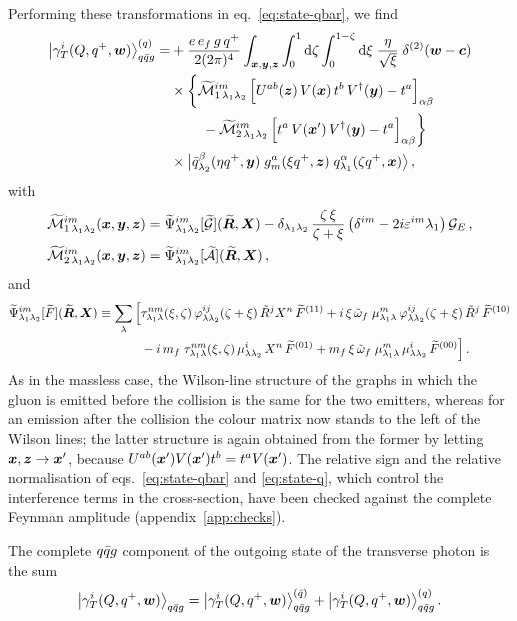 Performing these transformations in eq.~\eqref{eq:state-qbar}, we find
\begin{align}
\big|\gamma_T^i(Q,q^+,\bm{w})\big\rangle^{(q)}_{q\bar q g}=&+\frac{e\,e_f\,g\,q^+}{2(2\pi)^4}\int_{\bm{x},\bm{y},\bm{z}}
\int_0^1{\rm d}\zeta\int_0^{1-\zeta}{\rm d}\xi\;\frac{\eta}{\sqrt\xi}\;\delta^{(2)}(\bm{w}-\bm{c})
\nonumber\\
&\times\bigg\{\widetilde{\mathcal{M}}^{im}_{1\,\lambda_1\lambda_2}\,\Big[U^{ab}(\bm{z})\,V(\bm{x})\,t^b\,V^\dagger(\bm{y})-t^a\Big]_{\alpha\beta}
\nonumber\\
&\qquad\;-\widetilde{\mathcal{M}}^{im}_{2\,\lambda_1\lambda_2}\,\Big[t^a\,V(\bm{x}')\,V^\dagger(\bm{y})-t^a\Big]_{\alpha\beta}\bigg\}
\nonumber\\
&\times\big|\bar q^\beta_{\lambda_2}(\eta q^+,\bm{y})\;g^a_m(\xi q^+,\bm{z})\;q^\alpha_{\lambda_1}(\zeta q^+,\bm{x})\big\rangle\,,
\label{eq:state-q}
\end{align}
with
\begin{align}
\widetilde{\mathcal{M}}^{im}_{1\,\lambda_1\lambda_2}(\bm{x},\bm{y},\bm{z})&=\widetilde{\Psi}^{im}_{\lambda_1\lambda_2}[\widetilde{\mathcal{G}}](\widetilde{\bm{R}},\bm{X})
-\delta_{\lambda_1\lambda_2}\,\frac{\zeta\,\xi}{\zeta+\xi}\,\big(\delta^{im}-2i\varepsilon^{im}\lambda_1\big)\,\mathcal{G}_E\,,
\nonumber\\
\widetilde{\mathcal{M}}^{im}_{2\,\lambda_1\lambda_2}(\bm{x},\bm{y},\bm{z})&=\widetilde{\Psi}^{im}_{\lambda_1\lambda_2}[\widetilde{\mathcal{A}}](\widetilde{\bm{R}},\bm{X})\,,
\label{eq:Mt}
\end{align}
and
\begin{align}
\widetilde{\Psi}^{im}_{\lambda_1\lambda_2}[\widetilde{F}](\widetilde{\bm{R}},\bm{X})\equiv\sum_\lambda\Big[&
\tau^{nm}_{\lambda_1\lambda}(\xi,\zeta)\,\varphi^{ij}_{\lambda\lambda_2}(\zeta+\xi)\,\tilde R^jX^n\,\widetilde{F}^{(11)}
+i\,\xi\,\tilde{\omega}_f\;\mu^m_{\lambda_1\lambda}\,\varphi^{ij}_{\lambda\lambda_2}(\zeta+\xi)\,\tilde R^j\,\widetilde{F}^{(10)}
\nonumber\\
&-i\,m_f\;\tau^{nm}_{\lambda_1\lambda}(\xi,\zeta)\,\mu^i_{\lambda\lambda_2}\,X^n\,\widetilde{F}^{(01)}
+m_f\,\xi\,\tilde{\omega}_f\;\mu^m_{\lambda_1\lambda}\,\mu^i_{\lambda\lambda_2}\,\widetilde{F}^{(00)}\Big]\,.
\label{eq:Psit}
\end{align}
As in the massless case, the Wilson-line structure of the graphs in which the gluon is emitted before
the collision is the same for the two emitters, whereas for an emission after the collision the colour
matrix now stands to the left of the Wilson lines; the latter structure is again obtained from the
former by letting $\bm{x},\bm{z}\to\bm{x}'$, because $U^{ab}(\bm{x}')V(\bm{x}')t^b=t^aV(\bm{x}')$. The relative sign and the
relative normalisation of eqs.~\eqref{eq:state-qbar} and \eqref{eq:state-q}, which control the
interference terms in the cross-section, have been checked against the complete Feynman amplitude
(appendix~\ref{app:checks}).

The complete $q\bar q g$ component of the outgoing state of the transverse photon is the sum
\begin{equation}
\big|\gamma_T^i(Q,q^+,\bm{w})\big\rangle_{q\bar q g}=\big|\gamma_T^i(Q,q^+,\bm{w})\big\rangle^{(\bar q)}_{q\bar q g}
+\big|\gamma_T^i(Q,q^+,\bm{w})\big\rangle^{(q)}_{q\bar q g}\,.
\label{eq:state}
\end{equation}
